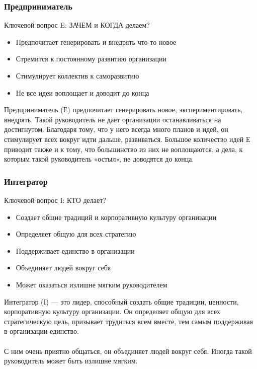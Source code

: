 \documentclass{../industrial-development}
\begin{document}
{\begin{frame} \frametitle{Предприниматель}
	\begin{block}{Ключевой вопрос E:}
		ЗАЧЕМ и КОГДА делаем?
	\end{block}	
 \begin{itemize}
	 \item Предпочитает генерировать и внедрять что-то новое
	 \item Стремится к постоянному развитию организации
	 \item Стимулирует коллектив к саморазвитию
	 \item Не все идеи воплощает и доводит до конца
 \end{itemize}
\end{frame}
\lecturenotes
Предприниматель (Е) предпочитает генерировать новое, экспериментировать, внедрять. Такой руководитель не дает организации останавливаться на достигнутом. Благодаря тому, что у него всегда много планов и идей, он стимулирует всех вокруг идти дальше, развиваться. Большое количество идей Е приводит также и к тому, что большинство из них не воплощаются, а дела, к которым такой руководитель «остыл», не доводятся до конца. 

\begin{frame} \frametitle{Интегратор}
	\begin{block}{Ключевой вопрос I:}
		КТО делает?
	\end{block}	
 \begin{itemize}
	 \item Создает общие традиций и корпоративную культуру организации
	 \item Определяет общую для всех стратегию
	 \item Поддерживает единство в организации
	 \item Объединяет людей вокруг себя
         \item Может оказаться излишне мягким руководителем
 \end{itemize}
\end{frame}
\lecturenotes
Интегратор (I) — это лидер, способный создать общие традиции, ценности, корпоративную культуру организации. Он определяет общую для всех стратегическую цель, призывает трудиться всем вместе, тем самым поддерживая в организации единство. \\~\\ С ним очень приятно общаться, он объединяет людей вокруг себя. Иногда такой руководитель может быть излишне мягким.

}
\end{document}
